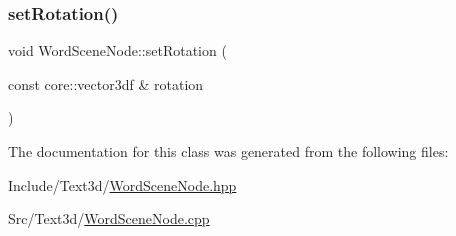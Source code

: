 \mbox{\label{class_word_scene_node_adf414873110d39866dba2c06e5ffc0d0}} 
\subsubsection{\texorpdfstring{setRotation()}{setRotation()}}
{\footnotesize\ttfamily void Word\+Scene\+Node\+::set\+Rotation (\begin{DoxyParamCaption}\item[{const core\+::vector3df \&}]{rotation }\end{DoxyParamCaption})}



The documentation for this class was generated from the following files\+:\begin{DoxyCompactItemize}
\item 
Include/\+Text3d/\mbox{\hyperlink{_word_scene_node_8hpp}{Word\+Scene\+Node.\+hpp}}\item 
Src/\+Text3d/\mbox{\hyperlink{_word_scene_node_8cpp}{Word\+Scene\+Node.\+cpp}}\end{DoxyCompactItemize}
